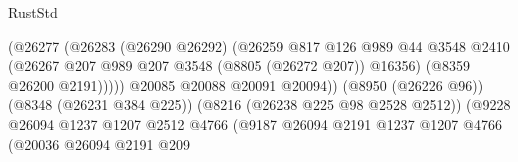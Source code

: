 \begin{lexlean}{RustStd}
\begin{coremodule}
                                                      (@26277
                                                        (@26283
                                                          (@26290 @26292)
                                                          (@26259
                                                            @817
                                                            @126
                                                            @989
                                                            @44
                                                            @3548
                                                            @2410
                                                            (@26267
                                                              @207
                                                              @989
                                                              @207
                                                              @3548
                                                              (@8805 (@26272 @207))
                                                              @16356)
                                                            (@8359 @26200 @2191)))))
                                                    @20085
                                                    @20088
                                                    @20091
                                                    @20094))
                                                (@8950 (@26226 @96))
                                                (@8348 (@26231 @384 @225))
                                                (@8216 (@26238 @225 @98 @2528 @2512))
                                                (@9228
                                                  @26094
                                                  @1237
                                                  @1207
                                                  @2512
                                                  @4766
                                                  (@9187
                                                    @26094
                                                    @2191
                                                    @1237
                                                    @1207
                                                    @4766
                                                    (@20036
                                                      @26094
                                                      @2191
                                                      @209

\end{coremodule}
\end{lexlean}
